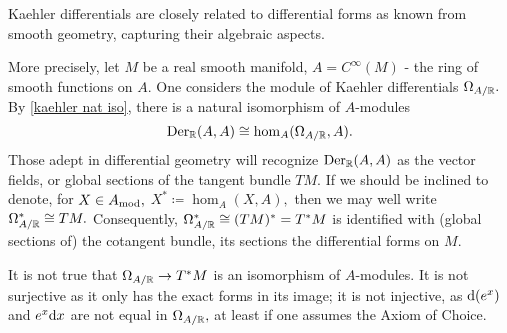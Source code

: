 \begin{note}
  Kaehler differentials are closely related to differential forms as known from smooth geometry, capturing their algebraic aspects.

  More precisely, let \(M\) be a real smooth manifold, \(A = C^\infty(M)\) - the ring of smooth functions on \(A.\) One considers the module of Kaehler differentials \(\Omega_{A/{\mathbb R}}.\) By \cref{kaehler nat iso}, there is a natural isomorphism of \(A\)-modules
  \[\operatorname{Der}_\mathbb R(A, A) \cong \hom_A(\Omega_{A/{\mathbb R}}, A).\]
  Those adept in differential geometry will recognize \(\operatorname{Der}_\mathbb R(A, A)\) as the vector fields, or global sections of the tangent bundle \(TM.\) If we should be inclined to denote, for \(X \in {A}_\mathrm{mod},\) \(X^* \coloneqq \hom_A(X, A),\) then we may well write \(\Omega_{A/{\mathbb R}}^{*} \cong TM.\)
  Consequently, \(\Omega_{A/{\mathbb R}}^* \cong (TM)^* = T^*M\) is identified with (global sections of) the cotangent bundle, its sections the differential forms on \(M.\)

  It is not true that \(\Omega_{A/{\mathbb R}} \to T^*M\) is an isomorphism of \(A\)-modules. It is not surjective as it only has the exact forms in its image; it is not injective, as \(\text{d}(e^x)\) and \(e^x \text{d} x\) are not equal in \(\Omega_{A/{\mathbb R}},\) at least if one assumes the Axiom of Choice. \cite{MO}
\end{note}












